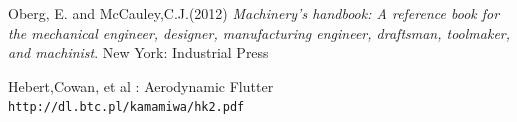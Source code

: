 \documentclass[]{article}
\begin{document}
\begin{thebibliography}{9}

	
	Oberg, E. and McCauley,C.J.(2012)
	\textit{Machinery's handbook: A reference book for the mechanical engineer, designer, manufacturing engineer, draftsman, toolmaker, and machinist}.
	New York: Industrial Press
	
	Hebert,Cowan, et al : Aerodynamic Flutter
	\\\texttt{http://dl.btc.pl/kamami\textunderscore wa/hk\textunderscore2.pdf}
\end{thebibliography}
\end{document}
